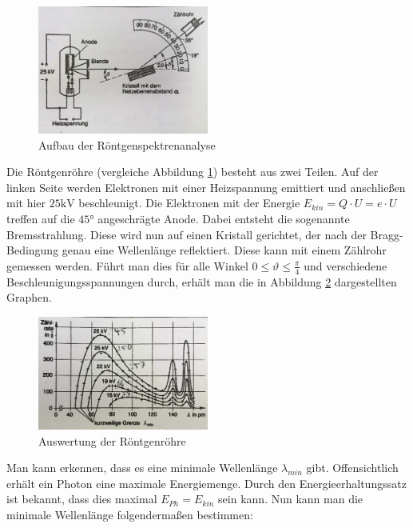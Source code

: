 \documentclass[a4paper]{article}
\begin{document}
			
				\begin{figure}[H]
					\centering
					\includegraphics[width=0.5\textwidth]{img/roentgenstrahlung_aufbau.jpg}
					\caption{Aufbau der Röntgenspektrenanalyse}
					\label{img:roentgenstrahlung_aufbau}
				\end{figure}
			\noindent Die Röntgenröhre (vergleiche Abbildung \ref{img:roentgenstrahlung_aufbau}) besteht aus zwei Teilen. Auf der linken Seite werden Elektronen mit einer Heizspannung emittiert und anschließen mit hier $25\si{\kilo\volt}$ beschleunigt. Die Elektronen mit der Energie $E_{kin} = Q\cdot U = e\cdot U$ treffen auf die $45\si{\degree}$ angeschrägte Anode. Dabei entsteht die sogenannte Bremsstrahlung. Diese wird nun auf einen Kristall gerichtet, der nach der Bragg-Bedingung genau eine Wellenlänge reflektiert. Diese kann mit einem Zählrohr gemessen werden. Führt man dies für alle Winkel $0\le \vartheta \le \frac{\pi}{4}$ und verschiedene Beschleunigungsspannungen durch, erhält man die in Abbildung \ref{img:roentgenspektren_auswertung} dargestellten Graphen.
			
	
			\begin{figure}[H]
				\centering
				\includegraphics[width=0.5\textwidth]{img/roentgenspektren_auswertung.jpg}
				\caption{Auswertung der Röntgenröhre}
				\label{img:roentgenspektren_auswertung}
			\end{figure}
		
			\noindent Man kann erkennen, dass es eine minimale Wellenlänge $\lambda_{min}$ gibt. Offensichtlich erhält ein Photon eine maximale Energiemenge. Durch den Energieerhaltungssatz ist bekannt, dass dies maximal $E_{Ph} = E_{kin}$ sein kann. Nun kann man die minimale Wellenlänge folgendermaßen bestimmen:
			
\end{document}
